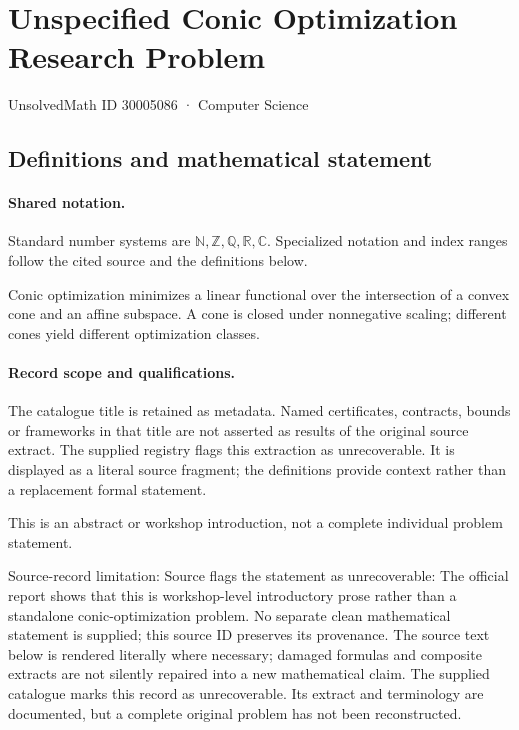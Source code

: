 \documentclass[11pt]{article}
\begin{document}
\setcounter{section}{30005085}
\section{Unspecified Conic Optimization Research Problem}\label{30005086}
{\small\sffamily UnsolvedMath ID 30005086 · Computer Science}
\subsection{Definitions and mathematical statement}

\paragraph{Shared notation.}Standard number systems are $\mathbb N,\mathbb Z,\mathbb Q,\mathbb R,\mathbb C$. Specialized notation and index ranges follow the cited source and the definitions below.


Conic optimization minimizes a linear functional over the intersection of a convex cone and an affine subspace. A cone is closed under nonnegative scaling; different cones yield different optimization classes.
\paragraph{Record scope and qualifications.}
The catalogue title is retained as metadata. Named certificates, contracts, bounds or frameworks in that title are not asserted as results of the original source extract.
The supplied registry flags this extraction as unrecoverable. It is displayed as a literal source fragment; the definitions provide context rather than a replacement formal statement.

This is an abstract or workshop introduction, not a complete individual problem statement.

Source-record limitation: Source flags the statement as unrecoverable: The official report shows that this is workshop-level introductory prose rather than a standalone conic-optimization problem. No separate clean mathematical statement is supplied; this source ID preserves its provenance.
The source text below is rendered literally where necessary; damaged formulas and composite extracts are not silently repaired into a new mathematical claim.
The supplied catalogue marks this record as unrecoverable. Its extract and terminology are documented, but a complete original problem has not been reconstructed.
\end{document}
